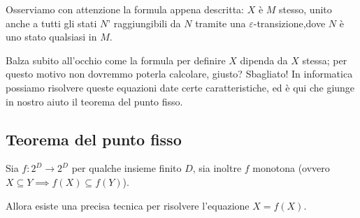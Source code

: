 \documentclass[class=book, crop=false, oneside, 12pt]{standalone}
\begin{document}
Osserviamo con attenzione la formula appena descritta: \(X\) è \(M\) stesso, unito anche a tutti gli stati \(N’\) raggiungibili da \(N\) tramite una \(\varepsilon\)-transizione,dove \(N\) è uno stato qualsiasi in \(M\).

Balza subito all'occhio come la formula per definire \(X\) dipenda da \(X\) stessa; per questo motivo non dovremmo poterla calcolare, giusto? 
Sbagliato! In informatica possiamo risolvere queste equazioni date certe caratteristiche, ed è qui che giunge in nostro aiuto il teorema del punto fisso.


\subsection{Teorema del punto fisso}
\begin{theorem}
    Sia \(f: 2^D \to 2^D\) per qualche insieme finito \(D\), sia inoltre \( f \) monotona (ovvero \(X \subseteq Y \implies f(X) \subseteq f(Y)\)).

    Allora esiste una precisa tecnica per risolvere l'equazione \(X = f(X)\).
\end{theorem}
\end{document}
